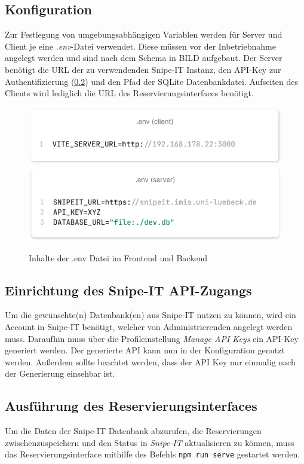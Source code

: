 \subsection{Konfiguration}
Zur Festlegung von umgebungsabhängigen Variablen werden für Server und Client je eine
\textit{.env}-Datei verwendet. Diese müssen vor der Inbetriebnahme angelegt werden und sind nach dem
Schema in BILD aufgebaut. Der Server benötigt die URL der zu verwendenden Snipe-IT Instanz, den
API-Key zur Authentifizierung (\ref{section:api}) und den Pfad der SQLite Datenbankdatei.
Aufseiten des Clients wird lediglich die URL des Reservierungsinterfaces benötigt.
\begin{figure}[h]
  \centering
  \includegraphics[scale=0.3]{Bilder/Code/client.png}
  \includegraphics[scale=0.3]{Bilder/Code/sever.png}
  \caption{Inhalte der .env Datei im Frontend und Backend}
  \label{fig:env}
\end{figure}


\subsection{Einrichtung des Snipe-IT API-Zugangs}
\label{section:api}
Um die gewünschte(n) Datenbank(en) aus Snipe-IT nutzen zu können, wird ein Account in Snipe-IT
benötigt, welcher von Administrierenden angelegt werden muss. Daraufhin muss über die
Profileinstellung \textit{Manage API Keys} ein API-Key generiert werden. Der generierte API kann nun
in der Konfiguration genutzt werden. Außerdem sollte beachtet werden, dass der API Key nur einmalig
nach der Generierung einsehbar ist.

\subsection{Ausführung des Reservierungsinterfaces}
Um die Daten der Snipe-IT Datenbank abzurufen, die Reservierungen zwischenzuspeichern und den
Status in \textit{Snipe-IT} aktualisieren zu können, muss das Reservierungsinterface mithilfe des
Befehls \lstinline{npm run serve} gestartet werden.


